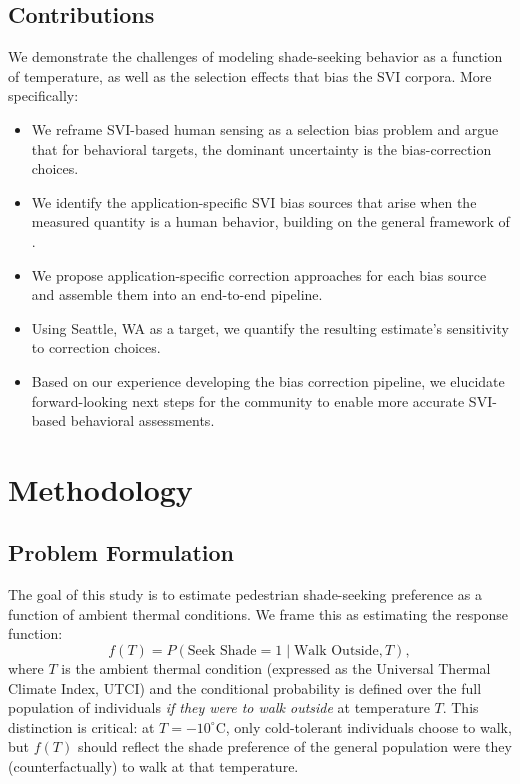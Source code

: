 \documentclass{ifacconf}
\begin{document}
\subsection{Contributions}

We demonstrate the challenges of modeling shade-seeking behavior as a function of temperature, as well as the selection effects that bias the SVI corpora.
More specifically: 

\begin{itemize}[leftmargin=*]
\item We reframe SVI-based human sensing as a selection bias problem and argue that for behavioral targets, the dominant uncertainty is the bias-correction choices.
\item We identify the application-specific SVI bias sources that arise when the measured quantity is a human behavior, building on the general framework of \cite{elrod2026towards}.
\item We propose application-specific correction approaches for each bias source and assemble them into an end-to-end pipeline.
\item Using Seattle, WA as a target, we quantify the resulting estimate's sensitivity to correction choices.
\item Based on our experience developing the bias correction pipeline, we elucidate forward-looking next steps for the community to enable more accurate SVI-based behavioral assessments. 
\end{itemize}

 \section{Methodology}
  \label{section:Methodology}

  \subsection{Problem Formulation}
  \label{subsec:problem_formulation}

  The goal of this study is to estimate pedestrian shade-seeking preference as a function of ambient thermal conditions. We frame
  this as estimating the response function:
  \begin{equation}
  f(T) = P(\text{Seek Shade} = 1 \mid \text{Walk Outside}, T),
  \label{eq:goal}
  \end{equation}
  where $T$ is the ambient thermal condition (expressed as the Universal Thermal Climate Index, UTCI) and the conditional probability
   is defined over the full population of individuals \emph{if they were to walk outside} at temperature $T$. This distinction is
  critical: at $T = -10^{\circ}$C, only cold-tolerant individuals choose to walk, but $f(T)$ should reflect the shade preference of
  the general population were they (counterfactually) to walk at that temperature.
\end{document}
